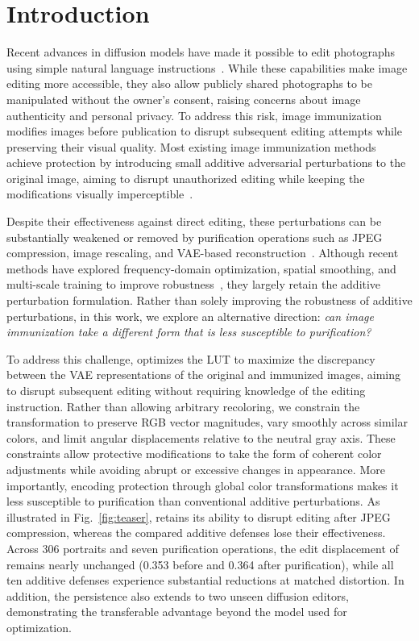 \section{Introduction}
\label{sec:intro}

Recent advances in diffusion models have made it possible to edit photographs using simple natural language instructions~\cite{rombach2022ldm,brooks2023instructpix2pix}. While these capabilities make image editing more accessible, they also allow publicly shared photographs to be manipulated without the owner's consent, raising concerns about image authenticity and personal privacy. To address this risk, image immunization~\cite{salman2023photoguard} modifies images before publication to disrupt subsequent editing attempts while preserving their visual quality. Most existing image immunization methods achieve protection by introducing small additive adversarial perturbations to the original image, aiming to disrupt unauthorized editing while keeping the modifications visually imperceptible~\cite{salman2023photoguard,liang2023mist,dia2025,dctshield2025}. 

Despite their effectiveness against direct editing, these perturbations can be substantially weakened or removed by purification operations such as JPEG compression, image rescaling, and VAE-based reconstruction~\cite{sandoval2023jpeg,honig2025noisyupscaling,purifyonce2026}. Although recent methods have explored frequency-domain optimization, spatial smoothing, and multi-scale training to improve robustness~\cite{dctshield2025,blurguard2025,srim2026}, they largely retain the additive perturbation formulation. Rather than solely improving the robustness of additive perturbations, in this work, we explore an alternative direction: \textit{can image immunization take a different form that is less susceptible to purification?}

To address this challenge, \capg{} optimizes the LUT to maximize the discrepancy between the VAE representations of the original and immunized images, aiming to disrupt subsequent editing without requiring knowledge of the editing instruction. Rather than allowing arbitrary recoloring, we constrain the transformation to preserve RGB vector magnitudes, vary smoothly across similar colors, and limit angular displacements relative to the neutral gray axis. These constraints allow protective modifications to take the form of coherent color adjustments while avoiding abrupt or excessive changes in appearance. More importantly, encoding protection through global color transformations makes it less susceptible to purification than conventional additive perturbations. As illustrated in Fig.~\ref{fig:teaser}, \capg{} retains its ability to disrupt editing after JPEG compression, whereas the compared additive defenses lose their effectiveness. Across 306 portraits and seven purification operations, the edit displacement of \capg{} remains nearly unchanged (0.353 before and 0.364 after purification), while all ten additive defenses experience substantial reductions at matched distortion. In addition, the persistence also extends to two unseen diffusion editors, demonstrating the transferable advantage beyond the model used for optimization.

